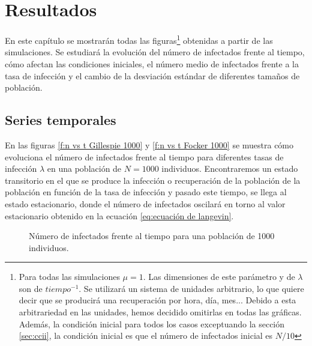 \chapter{Resultados} \label{ch:Resultados}

En este capítulo se mostrarán todas las figuras\footnote{Para todas las simulaciones $\mu=1$. 
Las dimensiones de este parámetro y de $\lambda$ son de $tiempo^{-1}$. Se utilizará un sistema de unidades arbitrario,
lo que quiere decir que se producirá una recuperación por hora, día, mes... Debido a esta arbitrariedad en las unidades,
hemos decidido omitirlas en todas las gráficas. Además, la condición inicial para todos los casos 
exceptuando la sección \ref{sec:ccii}, la condición inicial es que el número de infectados inicial es $N/10$}
obtenidas a partir de las simulaciones. Se estudiará la evolución del número de infectados frente al tiempo,
cómo afectan las condiciones iniciales, el número medio de infectados frente a la tasa de infección y el cambio de 
la desviación estándar de diferentes tamaños de población.

\section{Series temporales}
En las figuras \ref{f:n vs t Gillespie 1000} y \ref{f:n vs t Focker 1000} se muestra cómo evoluciona el número de infectados frente al 
tiempo para diferentes tasas de infección $\lambda$ en una población de $N=1000$ individuos. Encontraremos un estado transitorio en el que se produce 
la infección o recuperación de la población de la población en función de la tasa de infección y pasado este tiempo, se llega al estado 
estacionario, donde el número de infectados oscilará en torno al valor estacionario obtenido en la ecuación \ref{eq:ecuación de langevin}.

\begin{figure}[H]
    \begin{center}
      \begin{subfigure}
          [Gillespie.]{
          \texttt{[image: ni\_t\_1000.png]}
          \label{f:n vs t Gillespie 1000}}
      \end{subfigure}
  
      \vspace{0.5cm}
      
      \begin{subfigure}
          [Langevin.]{
          \texttt{[image: x vs t fockerplanck.png]}
          \label{f:n vs t Focker 1000}}
      \end{subfigure}
      
      \caption{Número de infectados frente al tiempo para una población de 1000 individuos.}
      \label{f:n vs t 1000}
    \end{center}    
\end{figure}
  

